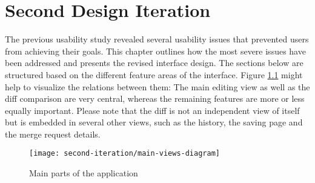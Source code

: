 \chapter{Second Design Iteration} \label{chapter:design-second-iteration}
The previous usability study revealed several usability issues that prevented users from achieving their goals. This chapter outlines how the most severe issues have been addressed and presents the revised interface design. The sections below are structured based on the different feature areas of the interface. Figure \ref{fig:main-views-diagram} might help to visualize the relations between them: The main editing view as well as the diff comparison are very central, whereas the remaining features are more or less equally important. Please note that the diff is not an independent view of itself but is embedded in several other views, such as the history, the saving page and the merge request details.

\begin{figure}[h!]
 \centering
 \texttt{[image: second-iteration/main-views-diagram]}
 \caption{Main parts of the application}
 \label{fig:main-views-diagram}
\end{figure}





